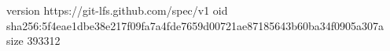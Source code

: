 version https://git-lfs.github.com/spec/v1
oid sha256:5f4eae1dbe38e217f09fa7a4fde7659d00721ae87185643b60ba34f0905a307a
size 393312

